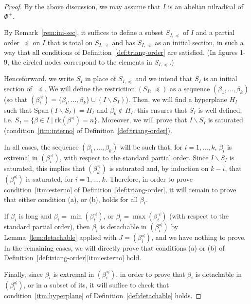 \documentclass[10pt]{amsart}
\theoremstyle{definition}
\theoremstyle{remark}
\newcommand\smeno{\smallsetminus}
\newcommand\gen{\mathrm{Span}}
\newcommand\rk{\mathrm{rk}}
\newcommand\be{\beta}
\newcommand\preq{\preccurlyeq}
\begin{document}
\begin{proof}
By the above discussion, we may assume that $I$ is an abelian nilradical of~$\Phi^+$. 
\par
By Remark~\ref{rem:ini-sec}, it suffices to define a subset $S_{I,\preq}$  of $I$ and a partial order $\preq$ on $I$ that is total on $S_{I,\preq}$ and has $S_{I,\preq}$ as an initial section, in such a way that all conditions of Definition~\ref{def:triang-order} are satisfied. (In figures 1-9, the circled nodes correspond to the elements in $S_{I,\preq}$.)
\par
Henceforward, we write $S_I$ in place of $S_{I,\preq}$ and we intend that $S_I$ is an initial section of~$\preq$.
We will define the restriction $(S_I, \preq)$ as a sequence $(\be_1, \dots, \be_k)$ (so that $(\be_i^\preq)=\{\be_i, \dots, \be_k\}\cup (I\smeno S_I)$).
Then, we will find a hyperplane $H_I$ such that $\gen(I\smeno S_I)=H_I$ and $\be_k\not\in H_I$: this ensures that  $S_I$ is well defined, i.e. $S_I=\{\be\in I\mid \rk(\be^\preq)=n\}$.
Moreover, we will prove that $I\smeno S_I$ is saturated (condition~\ref{itm:interno} of Definition~\ref{def:triang-order}). 
\par
In all cases, the sequence $(\be_1, \dots, \be_k)$ will be such that,  for $i=1, \dots, k$,  $\be_i$ is extremal in $(\be_i^\preq)$, with respect to the standard partial order. 
Since $I\smeno S_I$ is saturated, this implies that  $(\be_k^\preq)$ is saturated and, by induction on $k-i$, that $(\be_i^\preq)$ is saturated, for $i=1,\dots, k$.
Therefore, in order to prove condition~\ref{itm:esterno} of Definition~\ref{def:triang-order}, it will remain to prove that either condition (a),  or (b), holds for all $\be_i$.

\par
If $\be_i$ is long and  $\be_i=\min(\be_i^\preq)$, or $\be_i=\max(\be_i^\preq)$ (with respect to the standard partial order), then $\be_i$ is detachable in  $(\be_i^\preq)$ by Lemma~\ref{lem:detachable} applied with $J=(\be_i^\preq)$, and we have nothing to prove.
In the remaining cases, we will directly prove that conditions  (a) or (b) of Definition~\ref{def:triang-order}\ref{itm:esterno} hold.
\par

Finally, since $\be_i$ is extremal in $(\be_i^\preq)$, in order to prove that  $\be_i$ is detachable in  $(\be_i^\preq)$, or in a subset of its, it will suffice to check that condition~\ref{itm:hyperplane} of Definition~\ref{def:detachable} holds. 
\par


\end{proof}
\end{document}
